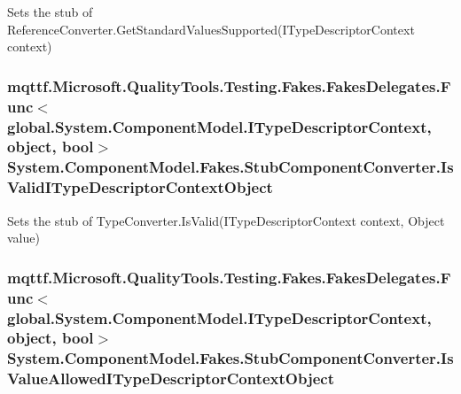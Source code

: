 Sets the stub of Reference\-Converter.\-Get\-Standard\-Values\-Supported(\-I\-Type\-Descriptor\-Context context)

\hypertarget{class_system_1_1_component_model_1_1_fakes_1_1_stub_component_converter_a71d6d437e3e509526074a04d9a957dbc}{
\subsubsection[{Is\-Valid\-I\-Type\-Descriptor\-Context\-Object}]{\setlength{\rightskip}{0pt plus 5cm}mqttf.\-Microsoft.\-Quality\-Tools.\-Testing.\-Fakes.\-Fakes\-Delegates.\-Func$<$global.\-System.\-Component\-Model.\-I\-Type\-Descriptor\-Context, object, bool$>$ System.\-Component\-Model.\-Fakes.\-Stub\-Component\-Converter.\-Is\-Valid\-I\-Type\-Descriptor\-Context\-Object}}\label{class_system_1_1_component_model_1_1_fakes_1_1_stub_component_converter_a71d6d437e3e509526074a04d9a957dbc}


Sets the stub of Type\-Converter.\-Is\-Valid(\-I\-Type\-Descriptor\-Context context, Object value)

\hypertarget{class_system_1_1_component_model_1_1_fakes_1_1_stub_component_converter_aef3dd62fe1c9bdecc6384553f8afb995}{
\subsubsection[{Is\-Value\-Allowed\-I\-Type\-Descriptor\-Context\-Object}]{\setlength{\rightskip}{0pt plus 5cm}mqttf.\-Microsoft.\-Quality\-Tools.\-Testing.\-Fakes.\-Fakes\-Delegates.\-Func$<$global.\-System.\-Component\-Model.\-I\-Type\-Descriptor\-Context, object, bool$>$ System.\-Component\-Model.\-Fakes.\-Stub\-Component\-Converter.\-Is\-Value\-Allowed\-I\-Type\-Descriptor\-Context\-Object}}\label{class_system_1_1_component_model_1_1_fakes_1_1_stub_component_converter_aef3dd62fe1c9bdecc6384553f8afb995}


